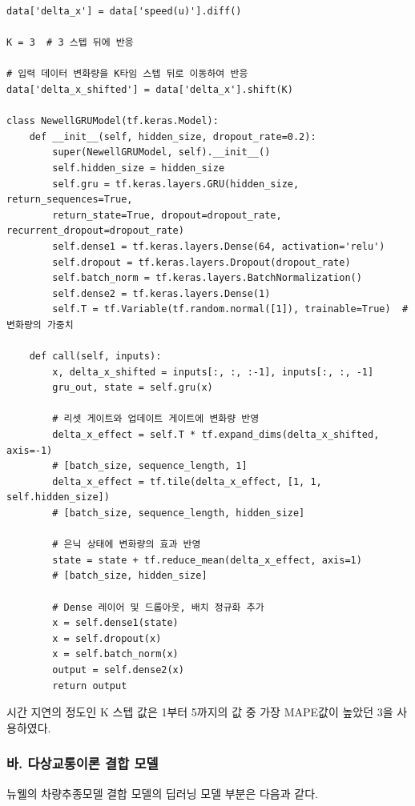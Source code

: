 \documentclass[11pt]{report}
\begin{document}
\begin{scriptsize}  %
\begin{verbatim}
data['delta_x'] = data['speed(u)'].diff()

K = 3  # 3 스텝 뒤에 반응

# 입력 데이터 변화량을 K타임 스텝 뒤로 이동하여 반응
data['delta_x_shifted'] = data['delta_x'].shift(K)

class NewellGRUModel(tf.keras.Model):
    def __init__(self, hidden_size, dropout_rate=0.2):
        super(NewellGRUModel, self).__init__()
        self.hidden_size = hidden_size
        self.gru = tf.keras.layers.GRU(hidden_size, return_sequences=True, 
		return_state=True, dropout=dropout_rate, recurrent_dropout=dropout_rate)
        self.dense1 = tf.keras.layers.Dense(64, activation='relu')
        self.dropout = tf.keras.layers.Dropout(dropout_rate)
        self.batch_norm = tf.keras.layers.BatchNormalization()
        self.dense2 = tf.keras.layers.Dense(1)
        self.T = tf.Variable(tf.random.normal([1]), trainable=True)  # 변화량의 가중치

    def call(self, inputs):
        x, delta_x_shifted = inputs[:, :, :-1], inputs[:, :, -1]
        gru_out, state = self.gru(x)

        # 리셋 게이트와 업데이트 게이트에 변화량 반영
        delta_x_effect = self.T * tf.expand_dims(delta_x_shifted, axis=-1)  
		# [batch_size, sequence_length, 1]
        delta_x_effect = tf.tile(delta_x_effect, [1, 1, self.hidden_size])  
		# [batch_size, sequence_length, hidden_size]

        # 은닉 상태에 변화량의 효과 반영
        state = state + tf.reduce_mean(delta_x_effect, axis=1)  
		# [batch_size, hidden_size]

        # Dense 레이어 및 드롭아웃, 배치 정규화 추가
        x = self.dense1(state)
        x = self.dropout(x)
        x = self.batch_norm(x)
        output = self.dense2(x)
        return output
\end{verbatim}
\end{scriptsize}

\indent 시간 지연의 정도인 K 스텝 값은 1부터 5까지의 값 중 가장 MAPE값이 높았던 3을 사용하였다. 

\subsubsection*{바. 다상교통이론 결합 모델}
뉴웰의 차량추종모델 결합 모델의 딥러닝 모델 부분은 다음과 같다. 
\end{document}

